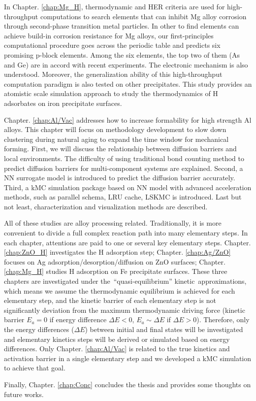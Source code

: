 In Chapter. \ref{chap:Mg_H}, thermodynamic and \acf{HER} criteria are used for high-throughput computations to search elements that can inhibit Mg alloy corrosion through second-phase transition metal particles. In other to find elements can achieve build-in corrosion resistance for Mg alloys, our first-principles computational procedure goes across the periodic table and predicts six promising p-block elements. Among the six elements, the top two of them (As and Ge) are in accord with recent experiments. The electronic mechanism is also understood. Moreover, the generalization ability of this high-throughput computation paradigm is also tested on other precipitates. This study provides an atomistic scale simulation approach to study the thermodynamics of H adsorbates on iron precipitate surfaces.

Chapter. \ref{chap:Al/Vac} addresses how to increase formability for high strength Al alloys. This chapter will focus on methodology development to slow down clustering during natural aging to expand the time window for mechanical forming. First, we will discuss the relationship between diffusion barriers and local environments. The difficulty of using traditional bond counting method to predict diffusion barriers for multi-component systems are explained. Second, a \acf{NN} surrogate model is introduced to predict the diffusion barrier accurately. Third, a \acf{kMC} simulation package based on \ac{NN} model with advanced acceleration methods, such as parallel schema, \acf{LRU} cache, \acf{LSKMC} is introduced. Last but not least, characterization and visualization methods are described.

All of these studies are alloy processing related. Traditionally, it is more convenient to divide a full complex reaction path into many elementary steps. In each chapter, attentions are paid to one or several key elementary steps. Chapter. \ref{chap:ZnO_H} investigates the H adsorption step; Chapter. \ref{chap:Ag/ZnO} focuses on Ag adsorption/desorption/diffusion on ZnO surfaces; Chapter. \ref{chap:Mg_H} studies H adsorption on Fe precipitate surfaces. These three chapters are investigated under the ``quasi-equilibrium'' kinetic approximations, which means we assume the thermodynamic equilibrium is achieved for each elementary step, and the kinetic barrier of each elementary step is not significantly deviation from the maximum thermodynamic driving force (kinetic barrier $E_a = 0$ if energy difference $\Delta E < 0$, $E_a \sim \Delta E$ if $\Delta E > 0$). Therefore, only the energy differences ($\Delta E$) between initial and final states will be investigated and elementary kinetics steps will be derived or simulated based on energy differences. Only Chapter. \ref{chap:Al/Vac} is related to the true kinetics and activation barrier in a single elementary step and we developed a \ac{kMC} simulation to achieve that goal.

Finally, Chapter. \ref{chap:Conc} concludes the thesis and provides some thoughts on future works.